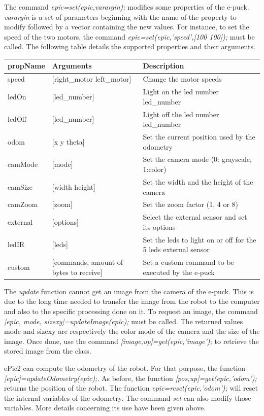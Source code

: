 \documentclass[11pt,oneside,english,a4paper]{article}
\begin{document}
\par The command \emph{epic=set(epic,varargin);} modifies some properties of the e-puck. \emph{varargin} is a set of parameters beginning with the name of the property to modify followed by a vector containing the new values. For instance, to set the speed of the two motors, the command \emph{epic=set(epic,'speed',[100 100]);} must be called. The following table details the supported properties and their arguments.
\setlongtables
\begin{longtable}{|l|l|p{4.8cm}|}
\hline
propName & Arguments & Description\\
\hline
speed & [right\_motor left\_motor] & Change the motor speeds\\
\hline
ledOn & [led\_number] & Light on the led number led\_number\\
\hline
ledOff & [led\_number] & Light off the led number led\_number\\
\hline
odom & [x y theta] & Set the current position used by the odometry\\
\hline
camMode & [mode] & Set the camera mode (0: grayscale, 1:color)\\
\hline
camSize & [width height] & Set the width and the height of the camera\\
\hline
camZoom & [zoom] & Set the zoom factor (1, 4 or 8)\\
\hline
external & [options] & Select the external sensor and set its options\\
\hline
ledIR & [leds] & Set the leds to light on or off for the 5 leds external sensor\\
\hline
custom & [commands, amount of bytes to receive] & Set a custom command to be executed by the e-puck\\
\hline
\end{longtable}

\par The \emph{update} function cannot get an image from the camera of the e-puck. This is due to the long time needed to transfer the image from the robot to the computer and also to the specific processing done on it. To request an image, the command \emph{[epic, mode, sizexy]=updateImage(epic);} must be called. The returned values mode and sizexy are respectively the color mode of the camera and the size of the image. Once done, use the command \emph{[image,up]=get(epic,'image');} to retrieve the stored image from the class.

\par ePic2 can compute the odometry of the robot. For that purpose, the function \newline \emph{[epic]=updateOdometry(epic);}. As before, the function \emph{[pos,up]=get(epic,'odom');} returns the position of the robot. The function \emph{epic=reset(epic,'odom');} will reset the internal variables of the odometry. The command \emph{set} can also modify those variables. More details concerning its use have been given above.
\end{document}
